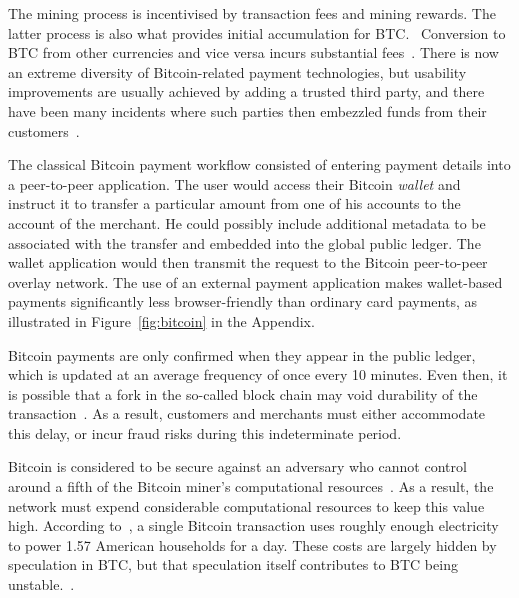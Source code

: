 \documentclass{IEEEtran}
\begin{document}
The mining process is incentivised by transaction fees and mining
rewards. The latter process is also what provides initial accumulation
for BTC.~\cite{nakamoto2008bitcoin} Conversion to BTC from
other currencies and vice versa incurs substantial fees~\cite{BTCfees}.
There is now an extreme diversity of Bitcoin-related payment
technologies, but usability improvements are usually achieved by
adding a trusted third party, and there have been many incidents
where such parties then embezzled funds from their customers~\cite{BTC:demise}.

The
classical Bitcoin payment workflow consisted of entering payment
details into a peer-to-peer application.  The user would access their
Bitcoin {\em wallet} and instruct it to transfer a particular amount
from one of his accounts to the account of the merchant. He could possibly
include additional metadata to be associated with the transfer and
embedded into the global public ledger.
The wallet application would
then transmit the request to the Bitcoin peer-to-peer overlay network.
The use of an external payment application makes wallet-based payments
significantly less browser-friendly than ordinary card payments, as
illustrated in Figure~\ref{fig:bitcoin} in the Appendix.

Bitcoin payments are only confirmed when they appear in the public
ledger, which is updated at an average frequency of once every 10
minutes.  Even then, it is possible that a fork in the so-called block
chain may void durability of the
transaction~\cite{nakamoto2008bitcoin}.  As a result, customers and
merchants must either accommodate this delay, or incur fraud risks
during this indeterminate period.

Bitcoin is considered to be secure against an adversary who cannot
control around a fifth of the Bitcoin miner's computational
resources~\cite{BTC:Bahack13,BTC:MajorityNotEnough,BTC:Eclipse}.  %
As a result, the network must expend considerable computational
resources to keep this value high.
According to~\cite{vice_btc_unsustainable}, a single Bitcoin transaction uses roughly enough
electricity to power 1.57 American households for a day.
These costs are largely hidden by speculation in BTC,
but that speculation itself contributes to BTC being
unstable.~\cite{jeffries_economists_v_btc,lehmann_btc_fools_gold,lewis_btc_is_junk}. %
\end{document}
